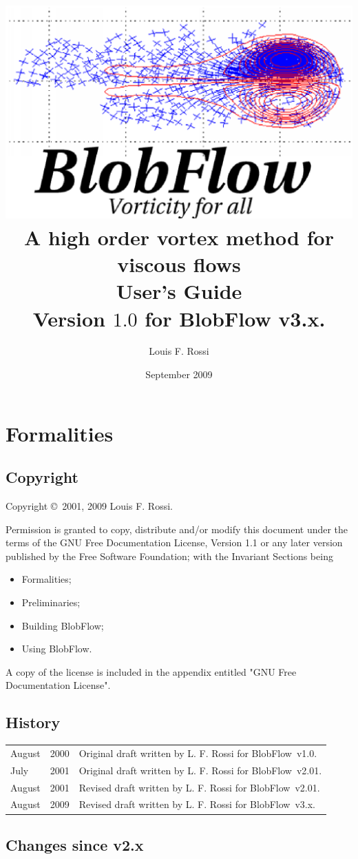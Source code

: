 \documentclass[12pt]{report}
\title{\includegraphics{figs/BlobFlow_logo} \\
 A high order vortex method for viscous flows \\
User's Guide \\ Version $1.0$ for BlobFlow v3.x.}
\author{Louis F. Rossi}
\date{September 2009}
\newcommand{\BF}{BlobFlow}
\begin{document}
\maketitle

\tableofcontents

\chapter{Formalities}

\section{Copyright}

Copyright \copyright \ 2001, 2009 Louis F. Rossi. 

Permission is granted to copy, distribute
and/or modify this document under the terms of the GNU Free Documentation
License, Version 1.1 or any later version published by the Free Software
Foundation; with the Invariant Sections being 
\begin{itemize}
\item Formalities;

\item Preliminaries;

\item Building \BF;

\item Using \BF.

\end{itemize}
A
copy of the license is included in the appendix entitled "GNU Free
Documentation License".

\section{History}


\begin{tabular}{lll}
August & 2000 & Original draft written by L. F. Rossi for 
\BF~v1.0. \\
July & 2001 & Original draft written by L. F. Rossi for 
\BF~v2.01. \\
August & 2001 & Revised draft written by L. F. Rossi for 
\BF~v2.01. \\
August & 2009 & Revised draft written by L. F. Rossi for 
\BF~v3.x. \\
\end{tabular}

\section{Changes since v2.x}
\end{document}
